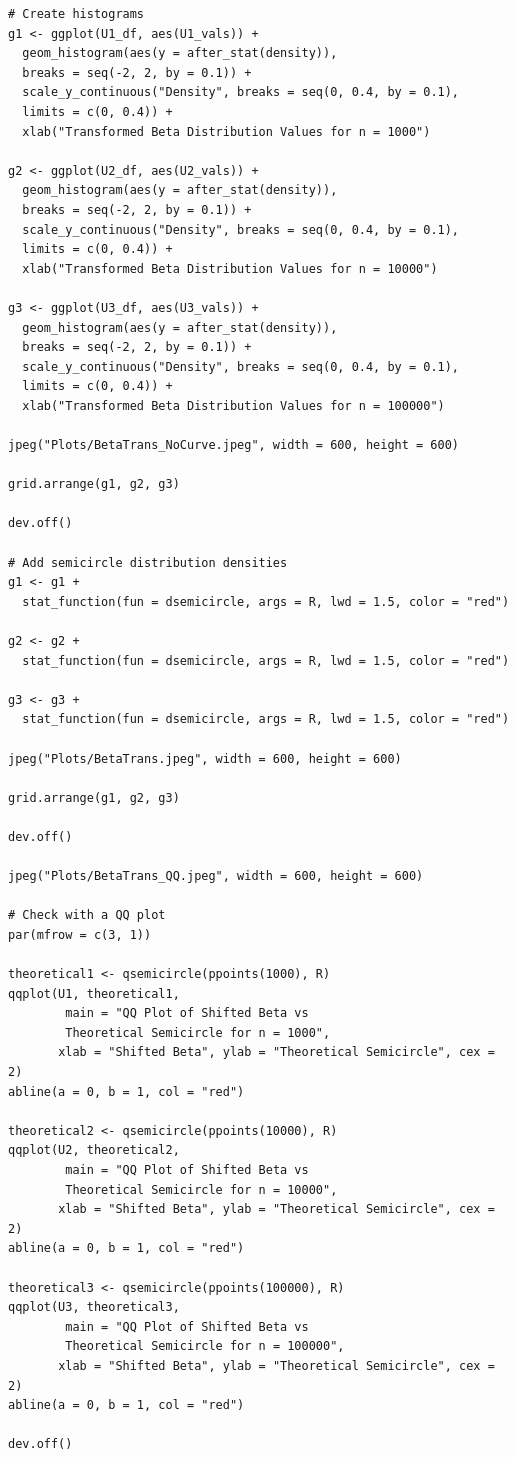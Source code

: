 \documentclass[11pt]{asaproc}
\begin{document}
\begin{verbatim}
# Create histograms
g1 <- ggplot(U1_df, aes(U1_vals)) +
  geom_histogram(aes(y = after_stat(density)), 
  breaks = seq(-2, 2, by = 0.1)) +
  scale_y_continuous("Density", breaks = seq(0, 0.4, by = 0.1), 
  limits = c(0, 0.4)) +
  xlab("Transformed Beta Distribution Values for n = 1000")

g2 <- ggplot(U2_df, aes(U2_vals)) +
  geom_histogram(aes(y = after_stat(density)), 
  breaks = seq(-2, 2, by = 0.1)) +
  scale_y_continuous("Density", breaks = seq(0, 0.4, by = 0.1), 
  limits = c(0, 0.4)) +
  xlab("Transformed Beta Distribution Values for n = 10000")

g3 <- ggplot(U3_df, aes(U3_vals)) +
  geom_histogram(aes(y = after_stat(density)), 
  breaks = seq(-2, 2, by = 0.1)) +
  scale_y_continuous("Density", breaks = seq(0, 0.4, by = 0.1), 
  limits = c(0, 0.4)) +
  xlab("Transformed Beta Distribution Values for n = 100000")

jpeg("Plots/BetaTrans_NoCurve.jpeg", width = 600, height = 600)

grid.arrange(g1, g2, g3)

dev.off()

# Add semicircle distribution densities
g1 <- g1 +
  stat_function(fun = dsemicircle, args = R, lwd = 1.5, color = "red")

g2 <- g2 +
  stat_function(fun = dsemicircle, args = R, lwd = 1.5, color = "red")

g3 <- g3 +
  stat_function(fun = dsemicircle, args = R, lwd = 1.5, color = "red")

jpeg("Plots/BetaTrans.jpeg", width = 600, height = 600)

grid.arrange(g1, g2, g3)

dev.off()

jpeg("Plots/BetaTrans_QQ.jpeg", width = 600, height = 600)

# Check with a QQ plot
par(mfrow = c(3, 1))

theoretical1 <- qsemicircle(ppoints(1000), R)
qqplot(U1, theoretical1, 
        main = "QQ Plot of Shifted Beta vs 
        Theoretical Semicircle for n = 1000",
       xlab = "Shifted Beta", ylab = "Theoretical Semicircle", cex = 2)
abline(a = 0, b = 1, col = "red")

theoretical2 <- qsemicircle(ppoints(10000), R)
qqplot(U2, theoretical2, 
        main = "QQ Plot of Shifted Beta vs 
        Theoretical Semicircle for n = 10000",
       xlab = "Shifted Beta", ylab = "Theoretical Semicircle", cex = 2)
abline(a = 0, b = 1, col = "red")

theoretical3 <- qsemicircle(ppoints(100000), R)
qqplot(U3, theoretical3, 
        main = "QQ Plot of Shifted Beta vs 
        Theoretical Semicircle for n = 100000",
       xlab = "Shifted Beta", ylab = "Theoretical Semicircle", cex = 2)
abline(a = 0, b = 1, col = "red")

dev.off()

\end{verbatim}
\end{document}
